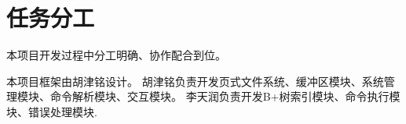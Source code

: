 \section{任务分工}
    本项目开发过程中分工明确、协作配合到位。

    本项目框架由胡津铭设计。%
    胡津铭负责开发页式文件系统、缓冲区模块、系统管理模块、命令解析模块、交互模块。%
    李天润负责开发B+树索引模块、命令执行模块、错误处理模块.
